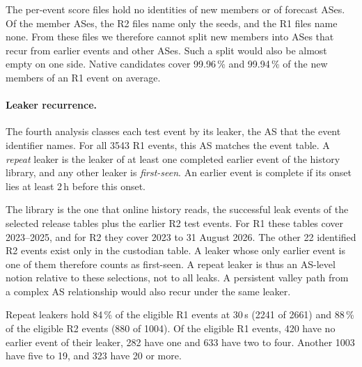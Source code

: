 The per-event score files hold no identities of new members or of forecast ASes.
Of the member ASes, the R2 files name only the seeds, and the R1 files name none.
From these files we therefore cannot split new members into ASes that recur from earlier events and other ASes.
Such a split would also be almost empty on one side.
Native candidates cover 99.96\,\% and 99.94\,\% of the new members of an R1 event on average.

\paragraph{Leaker recurrence.}
The fourth analysis classes each test event by its leaker, the AS that the event identifier names.
For all \num{3543} R1 events, this AS matches the event table.
A \emph{repeat} leaker is the leaker of at least one completed earlier event of the history library, and any other leaker is \emph{first-seen}.
An earlier event is complete if its onset lies at least 2\,h before this onset.

The library is the one that online history reads, the successful leak events of the selected release tables plus the earlier R2 test events.
For R1 these tables cover 2023--2025, and for R2 they cover 2023 to 31 August 2026.
The other 22 identified R2 events exist only in the custodian table.
A leaker whose only earlier event is one of them therefore counts as first-seen.
A repeat leaker is thus an AS-level notion relative to these selections, not to all leaks.
A persistent valley path from a complex AS relationship would also recur under the same leaker.

Repeat leakers hold 84\,\% of the eligible R1 events at 30\,s (\num{2241} of \num{2661}) and 88\,\% of the eligible R2 events (880 of \num{1004}).
Of the eligible R1 events, 420 have no earlier event of their leaker, 282 have one and 633 have two to four.
Another \num{1003} have five to 19, and 323 have 20 or more.

